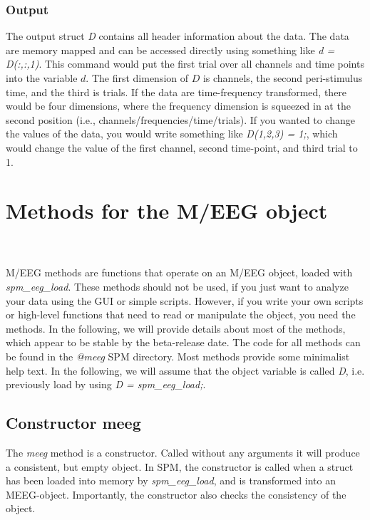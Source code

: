 \subsubsection{Output}
The output struct {\textit D} contains all header information about the
data. The data are memory mapped and can be accessed directly using
something like \textit{d = D(:,:,1)}. This command would put the first
trial over all channels and time points into the variable $d$. The
first dimension of $D$ is channels, the second peri-stimulus time, and
the third is trials. If the data are time-frequency transformed, there
would be four dimensions, where the frequency dimension is squeezed in
at the second position (i.e., channels/frequencies/time/trials). If
you wanted to change the values of the data, you would write something
like \textit{D(1,2,3) = 1;}, which would change the value of the first
channel, second time-point, and third trial to 1.


\section{Methods for the M/EEG object}

\\
\\
M/EEG methods are functions that operate on an M/EEG object, loaded
with \textit{spm\_eeg\_load}. These methods should not be used, if you just
want to analyze your data using the GUI or simple scripts. However, if
you write your own scripts or high-level functions that need to read
or manipulate the object, you need the methods. In the following, we
will provide details about most of the methods, which appear to be
stable by the beta-release date. The code for all methods
can be found in the \textit{@meeg} SPM directory. Most methods provide
some minimalist help text. In the following, we will assume that the
object variable is called \textit{D}, i.e. previously load by using \textit{D
  = spm\_eeg\_load;}.

\subsection{Constructor meeg}
The \textit{meeg} method is a constructor. Called without any arguments it
will produce a consistent, but empty object. In SPM, the constructor
is called when a struct has been loaded into memory by
\textit{spm\_eeg\_load}, and is transformed into an
MEEG-object. Importantly, the constructor also checks the consistency
of the object. 

